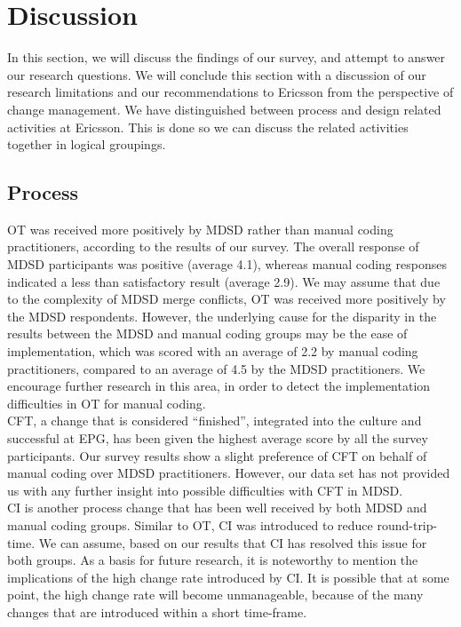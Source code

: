 \documentclass[final_report_innit.tex]{subfiles}
\begin{document}
\section{Discussion}

In this section, we will discuss the findings of our survey, and attempt to answer our research questions. We will conclude this section with a discussion of our research limitations and our recommendations to Ericsson from the perspective of change management. We have distinguished between process and design related activities at Ericsson. This is done so we can discuss the related activities together in logical groupings.

\subsection{Process}

OT was received more positively by MDSD rather than manual coding practitioners, according to the results of our survey. The overall response of MDSD participants was positive (average 4.1), whereas manual coding responses indicated a less than satisfactory result (average 2.9). We may assume that due to the complexity of MDSD merge conflicts, OT was received more positively by the MDSD respondents. However, the underlying cause for the disparity in the results between the MDSD and manual coding groups may be the ease of implementation, which was scored with an average of 2.2 by manual coding practitioners, compared to an average of 4.5 by the MDSD practitioners. We encourage further research in this area, in order to detect the implementation difficulties in OT for manual coding.
\\

CFT, a change that is considered ``finished'', integrated into the culture and successful at EPG, has been given the highest average score by all the survey participants. Our survey results show a slight preference of CFT on behalf of manual coding over MDSD practitioners. However, our data set has not provided us with any further insight into possible difficulties with CFT in MDSD. 
\\

CI is another process change that has been well received by both MDSD and manual coding groups. Similar to OT, CI was introduced to reduce round-trip-time. We can assume, based on our results that CI has resolved this issue for both groups. As a basis for future research, it is noteworthy to mention the implications of the high change rate introduced by CI. It is possible that at some point, the high change rate will become unmanageable, because of the many changes that are introduced within a short time-frame.
\\
\end{document}
